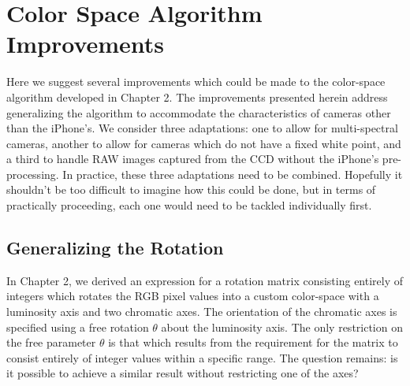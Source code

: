 
\section{Color Space Algorithm Improvements}\label{sec:ColorSpaceAlgorithmImprovements}
Here we suggest several improvements which could be made to the color-space algorithm developed in Chapter 2. The improvements presented herein address generalizing the algorithm to accommodate the characteristics of cameras other than the iPhone's. We consider three adaptations: one to allow for multi-spectral cameras, another to allow for cameras which do not have a fixed white point, and a third to handle RAW images captured from the CCD without the iPhone's pre-processing. In practice, these three adaptations need to be combined. Hopefully it shouldn't be too difficult to imagine how this could be done, but in terms of practically proceeding, each one would need to be tackled individually first.

\subsection{Generalizing the Rotation}\label{sec:GeneralizingTheRotation}
In Chapter 2, we derived an expression for a rotation matrix consisting entirely of integers which rotates the RGB pixel values into a custom color-space with a luminosity axis and two chromatic axes. The orientation of the chromatic axes is specified using a free rotation $\theta$ about the luminosity axis. The only restriction on the free parameter $\theta$ is that which results from the requirement for the matrix to consist entirely of integer values within a specific range. The question remains: is it possible to achieve a similar result without restricting one of the axes?

